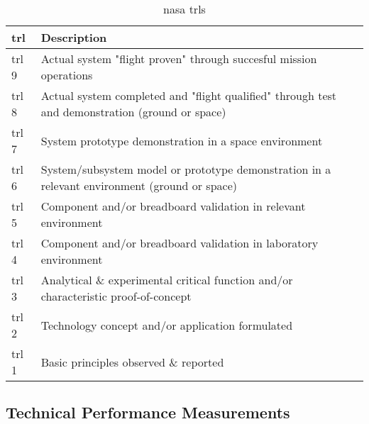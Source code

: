\begin{table}
	\caption{\gls{nasa} \glspl{trl} \cite{NASA2007}}
	\begin{tabular}{|p{}|p{}|}
		\hline
		\textbf{\acrfull{trl}} & \textbf{Description} \\ \hline \hline
		\gls{trl} 9& Actual system "flight proven" through succesful mission operations\\
		\gls{trl} 8& Actual system completed and "flight qualified" through test and demonstration (ground or space)\\
		\gls{trl} 7& System prototype demonstration in a space environment\\
		\gls{trl} 6& System/subsystem model or prototype demonstration in a relevant environment (ground or space)\\
		\gls{trl} 5& Component and/or breadboard validation in relevant environment\\
		\gls{trl} 4& Component and/or breadboard validation in laboratory environment\\
		\gls{trl} 3& Analytical \& experimental critical function and/or characteristic proof-of-concept\\
		\gls{trl} 2& Technology concept and/or application formulated\\
		\gls{trl} 1& Basic principles observed \& reported \\
		\hline
	\end{tabular}
\end{table}
\subsection{Technical Performance Measurements}
\label{subsec:tpms}